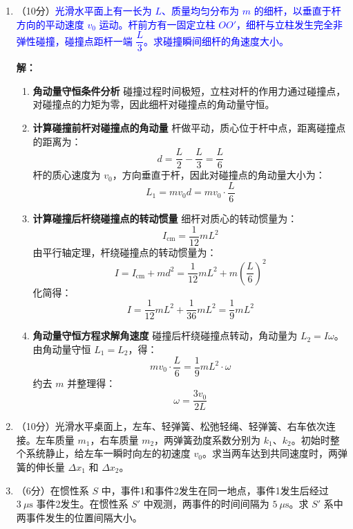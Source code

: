 \documentclass[11pt,a4paper]{article}
\begin{document}
\begin{enumerate}
    \item（10分）\textcolor{blue}{光滑水平面上有一长为 \( L \)、质量均匀分布为 \( m \) 的细杆，以垂直于杆方向的平动速度 \( v_0 \) 运动。杆前方有一固定立柱 \( OO' \)，细杆与立柱发生完全非弹性碰撞，碰撞点距杆一端 \( \dfrac{L}{3} \)。求碰撞瞬间细杆的角速度大小。}
\vspace{0.5em}

\textbf{解：}
\begin{enumerate}
    \item \textbf{角动量守恒条件分析}
    碰撞过程时间极短，立柱对杆的作用力通过碰撞点，对碰撞点的力矩为零，因此细杆对碰撞点的角动量守恒。

    \item \textbf{计算碰撞前杆对碰撞点的角动量}
    杆做平动，质心位于杆中点，距离碰撞点的距离为：
    \[
    d = \frac{L}{2} - \frac{L}{3} = \frac{L}{6}
    \]
    杆的质心速度为 \( v_0 \)，方向垂直于杆，因此对碰撞点的角动量大小为：
    \[
    L_1 = m v_0 d = m v_0 \cdot \frac{L}{6}
    \]

    \item \textbf{计算碰撞后杆绕碰撞点的转动惯量}
    细杆对质心的转动惯量为：
    \[
    I_{\text{cm}} = \frac{1}{12} m L^2
    \]
    由平行轴定理，杆绕碰撞点的转动惯量为：
    \[
    I = I_{\text{cm}} + m d^2 = \frac{1}{12} m L^2 + m \left( \frac{L}{6} \right)^2
    \]
    化简得：
    \[
    I = \frac{1}{12} m L^2 + \frac{1}{36} m L^2 = \frac{1}{9} m L^2
    \]

    \item \textbf{角动量守恒方程求解角速度}
    碰撞后杆绕碰撞点转动，角动量为 \( L_2 = I \omega \)。
    由角动量守恒 \( L_1 = L_2 \)，得：
    \[
    m v_0 \cdot \frac{L}{6} = \frac{1}{9} m L^2 \cdot \omega
    \]
    约去 \( m \) 并整理得：
    \[
    \omega = \frac{3 v_0}{2 L}
    \]
\end{enumerate}
    \item（10分）光滑水平桌面上，左车、轻弹簧、松弛轻绳、轻弹簧、右车依次连接。左车质量 \( m_1 \)，右车质量 \( m_2 \)，两弹簧劲度系数分别为 \( k_1 \)、\( k_2 \)。初始时整个系统静止，给左车一瞬时向左的初速度 \( v_0 \)。求当两车达到共同速度时，两弹簧的伸长量 \( \Delta x_1 \) 和 \( \Delta x_2 \)。

    \item（6分）在惯性系 \( S \) 中，事件1和事件2发生在同一地点，事件1发生后经过 \( 3\ \mu\mathrm{s} \) 事件2发生。在惯性系 \( S' \) 中观测，两事件的时间间隔为 \( 5\ \mu\mathrm{s} \)。求 \( S' \) 系中两事件发生的位置间隔大小。
\end{enumerate}
\end{document}
